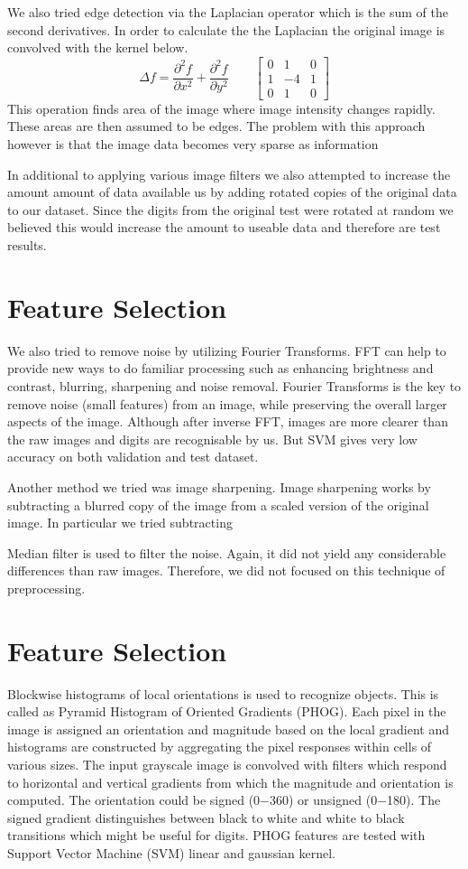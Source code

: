 \documentclass[10pt,twocolumn]{article}
\begin{document}
We also tried edge detection via the Laplacian operator which is the sum of the second derivatives. In order to calculate the the Laplacian the original image is convolved with the kernel  below.
\[\Delta f = \frac{\partial^2 f}{\partial x^2} + \frac{\partial^2 f}{\partial y^2}
\qquad
\begin{bmatrix}
0 & 1 & 0 \\
1 & -4 & 1 \\
0 & 1 & 0
\end{bmatrix}
\]
This operation finds area of the image where image intensity changes rapidly. These areas are then assumed to be edges. The problem with this approach however is that the image data becomes very sparse as information 

In additional to applying various image filters we also attempted to increase the amount amount of data available us by adding rotated copies of the original data to our dataset. Since the digits from the original test were rotated at random we believed this would increase the amount to useable data and therefore are test results.
\section{Feature Selection}
We also tried to remove noise by utilizing Fourier Transforms. FFT can help to provide new ways to do familiar processing such as enhancing brightness and contrast, blurring, sharpening and noise removal. Fourier Transforms is the key to remove noise (small features) from an image, while preserving the overall larger aspects of the image. Although after inverse FFT, images are more clearer than the raw images and digits are recognisable by us. But SVM gives very low accuracy on both validation and test dataset.

Another method we tried was image sharpening. Image sharpening works by subtracting a blurred copy of the image from a scaled version of the original image. In particular we tried subtracting 

Median filter is used to filter the noise. Again, it did not yield any considerable differences than raw images. Therefore, we did not focused on this technique of preprocessing.
\section{Feature Selection}
\cite {Maji09fastand} Blockwise histograms of local orientations is used to recognize objects. This is called as Pyramid Histogram of Oriented Gradients (PHOG). Each pixel in the image is assigned an orientation and magnitude based on the local gradient and histograms are constructed by aggregating the pixel responses within cells of various sizes. The input grayscale image is convolved with filters which respond to horizontal and vertical gradients from which the magnitude and orientation is computed. The orientation could be signed (0−360) or unsigned (0−180). The signed gradient distinguishes between black to white and white to black transitions which might be useful for digits. PHOG features are tested with Support Vector Machine (SVM) linear and gaussian kernel. 
\end{document}
